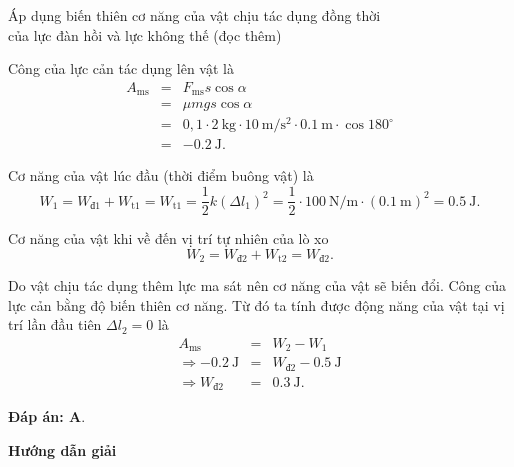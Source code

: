 \begin{dang}{Áp dụng biến thiên cơ năng của vật chịu tác dụng đồng thời \\của lực đàn hồi và lực không thế (đọc thêm)}
{		Công của lực cản tác dụng lên vật là
		\begin{eqnarray*}
			A_\text{ms}&=&F_\text{ms}s\cos\alpha\\
			&=&\mu mg s \cos\alpha\\
			&=& 0,1\cdot\SI{2}{\kilogram}\cdot\SI{10}{\meter/\second^2}\cdot\SI{0,1}{\meter}\cdot\cos 180^\circ\\
			&=&\SI{-0,2}{\joule}.
		\end{eqnarray*}
		
		Cơ năng của vật lúc đầu (thời điểm buông vật) là
		\begin{equation*}
			W_1=W_\text{đ1}+W_\text{t1}=W_\text{t1}=\dfrac{1}{2}k(\Delta l_1)^2=\dfrac{1}{2}\cdot\SI{100}{\newton/\meter}\cdot(\SI{0,1}{\meter})^2=\SI{0,5}{\joule}.
		\end{equation*}
		
		Cơ năng của vật khi về đến vị trí tự nhiên của lò xo
		\begin{equation*}
			W_2=W_\text{đ2}+W_\text{t2}=W_\text{đ2}.
		\end{equation*}
		
		Do vật chịu tác dụng thêm lực ma sát nên cơ năng của vật sẽ biến đổi. Công của lực cản bằng độ biến thiên cơ năng. Từ đó ta tính được động năng của vật tại vị trí lần đầu tiên $\Delta l_2=0$ là
		\begin{eqnarray*}
			A_\text{ms}&=&W_2-W_1\\
			\Rightarrow \SI{-0,2}{\joule}&=&W_\text{đ2}-\SI{0,5}{\joule}\\
			\Rightarrow W_\text{đ2}&=&\SI{0,3}{\joule}.
		\end{eqnarray*}
		
		\textbf{Đáp án: A}.
	}
	{\begin{center}
			\textbf{Hướng dẫn giải}
		\end{center}
		
}
\end{dang}
